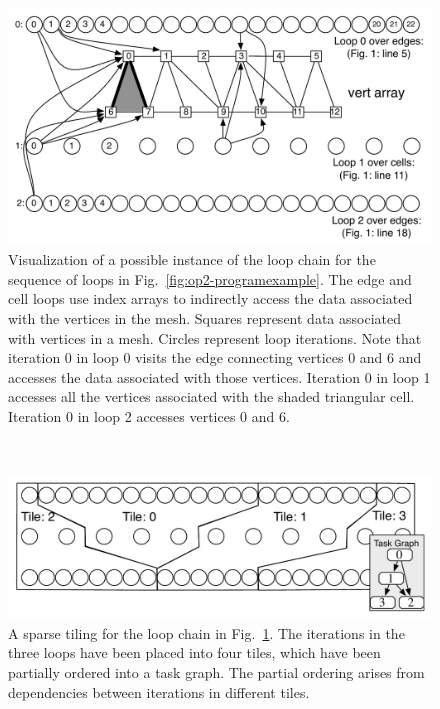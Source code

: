 \begin{figure}[t]
\centering
\includegraphics[width=\columnwidth]{sparsetiling/figures/tiling_example.pdf}
\caption{Visualization of a possible instance of the loop chain for the sequence of loops in Fig.~\ref{fig:op2-programexample}. The edge and cell loops use index arrays to indirectly access the data associated with the vertices in the mesh. Squares represent data associated with vertices in a mesh. Circles represent loop iterations. Note that iteration 0 in loop 0 visits the edge connecting vertices 0 and 6 and accesses the data associated with those vertices. Iteration 0 in loop 1 accesses all the vertices associated with the shaded triangular cell. Iteration 0 in loop 2 accesses vertices 0 and 6.}
\label{fig:loopchain}	
\end{figure}
~
\begin{figure}[t]
 \centering
		\includegraphics[width=.45\textwidth]{sparsetiling/figures/tiling_example_tiled.pdf}
\caption{A sparse tiling for the loop chain in Fig.~\ref{fig:loopchain}.  The iterations
in the three loops have been placed into four tiles, which have been partially ordered
into a task graph.  The partial ordering arises from dependencies between iterations
in different tiles.}
\label{fig:fstOnOp2}	
\end{figure}
~

